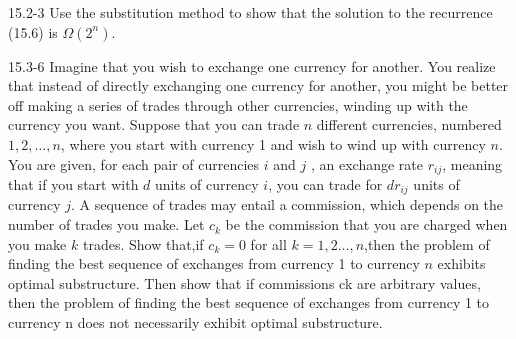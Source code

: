 





\homeworkheader{\classnameandsection}

\begin{problem}{15.2-3}
  Use the substitution method to show that the solution to the recurrence (15.6) is $\Omega(2^n)$.
\end{problem}

\begin{problem}{15.3-6}
  Imagine that you wish to exchange one currency for another. You realize that instead of directly exchanging one
  currency for another, you might be better off making a series of trades through other currencies, winding up with the
  currency you want. Suppose that you can trade $n$ different currencies, numbered $1, 2, \ldots, n$, where you start
  with currency 1 and wish to wind up with currency $n$. You are given, for each pair of currencies $i$ and $j$ , an
  exchange rate $r_{ij}$, meaning that if you start with $d$ units of currency $i$, you can trade for $dr_{ij}$ units of
  currency $j$. A sequence of trades may entail a commission, which depends on the number of trades you make. Let $c_k$
  be the commission that you are charged when you make $k$ trades. Show that,if $c_k = 0$ for all $k = 1,2
  \dots,n$,then the problem of finding the best sequence of exchanges from currency 1 to currency $n$ exhibits optimal
  substructure. Then show that if commissions ck are arbitrary values, then the problem of finding the best sequence of
  exchanges from currency 1 to currency n does not necessarily exhibit optimal substructure.
\end{problem}

